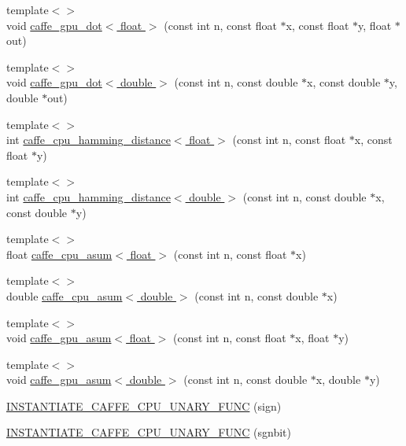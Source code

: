 \begin{DoxyCompactItemize}
\item 
{\footnotesize template$<$$>$ }\\void \hyperlink{namespacecaffe_a5e8cfaae0aac61e60850ba946e8d2c82}{caffe\+\_\+gpu\+\_\+dot$<$ float $>$} (const int n, const float $\ast$x, const float $\ast$y, float $\ast$out)
\item 
{\footnotesize template$<$$>$ }\\void \hyperlink{namespacecaffe_a9098494935f68e2644ed10b651bf9ae8}{caffe\+\_\+gpu\+\_\+dot$<$ double $>$} (const int n, const double $\ast$x, const double $\ast$y, double $\ast$out)
\item 
{\footnotesize template$<$$>$ }\\int \hyperlink{namespacecaffe_a9908d375431b1ade22a05df589479357}{caffe\+\_\+cpu\+\_\+hamming\+\_\+distance$<$ float $>$} (const int n, const float $\ast$x, const float $\ast$y)
\item 
{\footnotesize template$<$$>$ }\\int \hyperlink{namespacecaffe_a206e62a834f0082bea5ea07b02db625c}{caffe\+\_\+cpu\+\_\+hamming\+\_\+distance$<$ double $>$} (const int n, const double $\ast$x, const double $\ast$y)
\item 
{\footnotesize template$<$$>$ }\\float \hyperlink{namespacecaffe_a129b47115ae86ed907940d7fa8fb0576}{caffe\+\_\+cpu\+\_\+asum$<$ float $>$} (const int n, const float $\ast$x)
\item 
{\footnotesize template$<$$>$ }\\double \hyperlink{namespacecaffe_a1e9591a34f95ee26700fc5e60d35518c}{caffe\+\_\+cpu\+\_\+asum$<$ double $>$} (const int n, const double $\ast$x)
\item 
{\footnotesize template$<$$>$ }\\void \hyperlink{namespacecaffe_ab2dc35ebdfee2fb8084025a7b6054b52}{caffe\+\_\+gpu\+\_\+asum$<$ float $>$} (const int n, const float $\ast$x, float $\ast$y)
\item 
{\footnotesize template$<$$>$ }\\void \hyperlink{namespacecaffe_a9491fc3b370ec214614745b8c5f86258}{caffe\+\_\+gpu\+\_\+asum$<$ double $>$} (const int n, const double $\ast$x, double $\ast$y)
\item 
\hyperlink{namespacecaffe_abd71ac286d369a0473f28a5c3d8914d4}{I\+N\+S\+T\+A\+N\+T\+I\+A\+T\+E\+\_\+\+C\+A\+F\+F\+E\+\_\+\+C\+P\+U\+\_\+\+U\+N\+A\+R\+Y\+\_\+\+F\+U\+N\+C} (sign)
\item 
\hyperlink{namespacecaffe_a40984eb732d96c0a12cf43536ba19b0c}{I\+N\+S\+T\+A\+N\+T\+I\+A\+T\+E\+\_\+\+C\+A\+F\+F\+E\+\_\+\+C\+P\+U\+\_\+\+U\+N\+A\+R\+Y\+\_\+\+F\+U\+N\+C} (sgnbit)

\end{DoxyCompactItemize}
